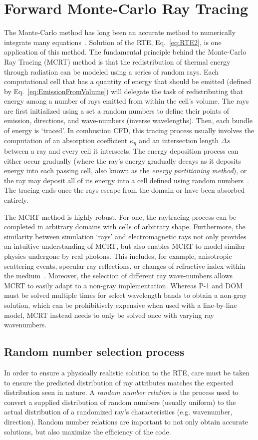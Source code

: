 \section{Forward Monte-Carlo Ray Tracing}
The Monte-Carlo method has long been an accurate method to numerically integrate many equations~\cite{Howell2021TheTransfer}.
Solution of the RTE, Eq.~\ref{eq:RTE2}, is one application of this method. 
The fundamental principle behind the Monte-Carlo Ray Tracing (MCRT) method is that the redistribution of thermal energy through radiation can be modeled using a series of random rays. 
Each computational cell that has a quantity of energy that should be emitted (defined by Eq.~\ref{eq:EmissionFromVolume}) will delegate the task of redistributing that energy among a number of rays emitted from within the cell's volume. The rays are first initialized using a set a random numbers to define their points of emission, directions, and wave-numbers (inverse wavelengths).
Then, each bundle of energy is `traced'.
In combustion CFD, this tracing process usually involves the computation of an absorption coefficient $\kappa_\eta$ and an intersection length $\Delta{}s$ between a ray and every cell it intersects.
The energy deposition process can either occur gradually (where the ray's energy gradually decays as it deposits energy into each passing cell, also known as the \textit{energy partitioning method}), or the ray may deposit all of its energy into a cell defined using random numbers~\cite{Modest2022ChapterMediac}.
The tracing ends once the rays escape from the domain or have been absorbed entirely.

The MCRT method is highly robust. For one, the raytracing process can be completed in arbitrary domains with cells of arbitrary shape. Furthermore, the similarity between simulation `rays' and electromagnetic rays not only provides an intuitive understanding of MCRT, but also enables MCRT to model similar physics undergone by real photons. This includes, for example, anisotropic scattering events, specular ray reflections, or changes of refractive index within the medium~\cite{Modest2022ChapterMediac}. Moreover, the selection of different ray wave-numbers allows MCRT to easily adapt to a non-gray implementation. Whereas P-1 and DOM must be solved multiple times for select wavelength bands to obtain a non-gray solution, which can be prohibitively expensive when used with a line-by-line model, MCRT instead needs to only be solved once with varying ray wavenumbers.

\subsection{Random number selection process}  \label{section:randomnumberrelations}
In order to ensure a physically realistic solution to the RTE, care must be taken to ensure the predicted distribution of ray attributes matches the expected distribution seen in nature. A \textit{random number relation} is the process used to convert a supplied distribution of random numbers (usually uniform) to the actual distribution of a randomized ray's characteristics (e.g. wavenumber, direction).
Random number relations are important to not only obtain accurate solutions, but also maximize the efficiency of the code.

